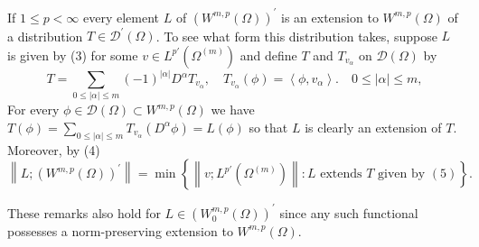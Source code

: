 \begin{para}
  If $1 \leq p<\infty$ every element $L$ of $\left(W^{m, p}(\Omega)\right)^{\prime}$ is an 
  extension to $W^{m,p}(\Omega)$ of a distribution $T \in \mathscr{D}^{\prime}(\Omega)$. To see what form this distribution takes, suppose $L$ is given by (3) for some $v \in L^{p'}(\Omega^{(m)})$ and define $T$ and $T_{v_\alpha}$ on $\mathscr{D}(\Omega)$ by
  \begin{equation}\label{eq:3.5}
    T=\sum_{0 \leq|\alpha| \leq m}(-1)^{|\alpha|} D^\alpha T_{v_\alpha}, \quad T_{v_\alpha}(\phi)=\left\langle\phi, v_\alpha\right\rangle . \quad 0 \leq|\alpha| \leq m,
  \end{equation}
  For every $\phi \in \mathscr{D}(\Omega) \subset W^{m, p}(\Omega)$ we have $T(\phi)=\sum_{0 \leq|\alpha| \leq m} T_{v_\alpha}\left(D^\alpha \phi\right)=L(\phi)$ so that $L$ is clearly an extension of $T$. Moreover, by (4)
  \[
  \left\|L ;\left(W^{m, p}(\Omega)\right)^{\prime}\right\|=\min \left\{\left\|v ; L^{p'}(\Omega^{(m)})\right\|: L \text { extends } T \text { given by }(5)\right\} .
  \]
\end{para}

These remarks also hold for $L \in\left(W_0^{m, p}(\Omega)\right)^{\prime}$ since any such functional possesses a norm-preserving extension to $W^{m,p}(\Omega)$.

